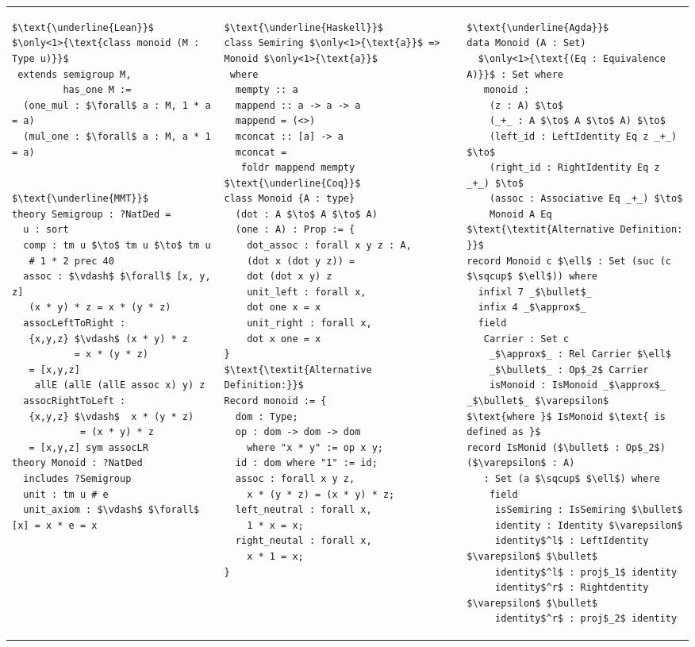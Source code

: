 \footnotesize
\begin{adjustbox}{width=1.2\columnwidth,center}
\begin{tabular}{p{7cm} p{7cm} p{7cm}}  
\begin{lstlisting}[mathescape]
$\text{\underline{Lean}}$
$\only<1>{\text{class monoid (M : Type u)}}$
 extends semigroup M, 
         has_one M :=
  (one_mul : $\forall$ a : M, 1 * a = a) 
  (mul_one : $\forall$ a : M, a * 1 = a)


$\text{\underline{MMT}}$
theory Semigroup : ?NatDed = 
  u : sort 
  comp : tm u $\to$ tm u $\to$ tm u 
   # 1 * 2 prec 40
  assoc : $\vdash$ $\forall$ [x, y, z]
   (x * y) * z = x * (y * z)    
  assocLeftToRight : 
   {x,y,z} $\vdash$ (x * y) * z 
           = x * (y * z) 
   = [x,y,z] 
    allE (allE (allE assoc x) y) z
  assocRightToLeft : 
   {x,y,z} $\vdash$  x * (y * z) 
            = (x * y) * z 
   = [x,y,z] sym assocLR 
theory Monoid : ?NatDed 
  includes ?Semigroup 
  unit : tm u # e 
  unit_axiom : $\vdash$ $\forall$ [x] = x * e = x       
\end{lstlisting}       
&
\begin{lstlisting}[mathescape]
$\text{\underline{Haskell}}$
class Semiring $\only<1>{\text{a}}$ => Monoid $\only<1>{\text{a}}$
 where 
  mempty :: a 
  mappend :: a -> a -> a 
  mappend = (<>) 
  mconcat :: [a] -> a 
  mconcat = 
   foldr mappend mempty 
$\text{\underline{Coq}}$
class Monoid {A : type}
  (dot : A $\to$ A $\to$ A)
  (one : A) : Prop := {
    dot_assoc : forall x y z : A, 
    (dot x (dot y z)) = 
    dot (dot x y) z
    unit_left : forall x, 
    dot one x = x 
    unit_right : forall x, 
    dot x one = x              
}
$\text{\textit{Alternative Definition:}}$
Record monoid := {
  dom : Type; 
  op : dom -> dom -> dom 
    where "x * y" := op x y; 
  id : dom where "1" := id; 
  assoc : forall x y z, 
    x * (y * z) = (x * y) * z; 
  left_neutral : forall x,   
    1 * x = x; 
  right_neutal : forall x,
    x * 1 = x; 
}
\end{lstlisting}
&
\begin{lstlisting}[mathescape]
$\text{\underline{Agda}}$
data Monoid (A : Set) 
  $\only<1>{\text{(Eq : Equivalence A)}}$ : Set where 
   monoid : 
    (z : A) $\to$ 
    (_+_ : A $\to$ A $\to$ A) $\to$
    (left_id : LeftIdentity Eq z _+_) $\to$ 
    (right_id : RightIdentity Eq z _+_) $\to$
    (assoc : Associative Eq _+_) $\to$
    Monoid A Eq 
$\text{\textit{Alternative Definition: }}$
record Monoid c $\ell$ : Set (suc (c $\sqcup$ $\ell$)) where 
  infixl 7 _$\bullet$_
  infix 4 _$\approx$_
  field 
   Carrier : Set c 
    _$\approx$_ : Rel Carrier $\ell$ 
    _$\bullet$_ : Op$_2$ Carrier 
    isMonoid : IsMonoid _$\approx$_ _$\bullet$_ $\varepsilon$ 
$\text{where }$ IsMonoid $\text{ is defined as }$
record IsMonid ($\bullet$ : Op$_2$) ($\varepsilon$ : A) 
   : Set (a $\sqcup$ $\ell$) where 
    field 
     isSemiring : IsSemiring $\bullet$ 
     identity : Identity $\varepsilon$ 
     identity$^l$ : LeftIdentity $\varepsilon$ $\bullet$ 
     identity$^l$ : proj$_1$ identity 
     identity$^r$ : Rightdentity $\varepsilon$ $\bullet$ 
     identity$^r$ : proj$_2$ identity           
\end{lstlisting}    
\end{tabular}  
\end{adjustbox}
